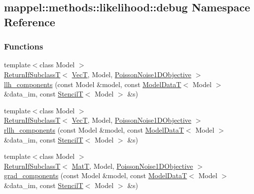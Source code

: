 \hypertarget{namespacemappel_1_1methods_1_1likelihood_1_1debug}{}\subsection{mappel\+:\+:methods\+:\+:likelihood\+:\+:debug Namespace Reference}
\label{namespacemappel_1_1methods_1_1likelihood_1_1debug}
\subsubsection*{Functions}
\begin{DoxyCompactItemize}
\item 
{\footnotesize template$<$class Model $>$ }\\\hyperlink{namespacemappel_a3b77d227658ba3ba9e16fea6fa6e626d}{Return\+If\+SubclassT}$<$ \hyperlink{namespacemappel_a2225ad69f358daa3f4f99282a35b9a3a}{VecT}, Model, \hyperlink{classmappel_1_1PoissonNoise1DObjective}{Poisson\+Noise1\+D\+Objective} $>$ \hyperlink{namespacemappel_1_1methods_1_1likelihood_1_1debug_a3ebb5c59ce538767de0717dbb543547a}{llh\+\_\+components} (const Model \&model, const \hyperlink{namespacemappel_a97f050df953605381ae9c901c3b125f1}{Model\+DataT}$<$ Model $>$ \&data\+\_\+im, const \hyperlink{namespacemappel_a3a06598240007876f8c4bf834ad86197}{StencilT}$<$ Model $>$ \&s)
\item 
{\footnotesize template$<$class Model $>$ }\\\hyperlink{namespacemappel_a3b77d227658ba3ba9e16fea6fa6e626d}{Return\+If\+SubclassT}$<$ \hyperlink{namespacemappel_a2225ad69f358daa3f4f99282a35b9a3a}{VecT}, Model, \hyperlink{classmappel_1_1PoissonNoise1DObjective}{Poisson\+Noise1\+D\+Objective} $>$ \hyperlink{namespacemappel_1_1methods_1_1likelihood_1_1debug_abee134828904f67b599234ec96a4a907}{rllh\+\_\+components} (const Model \&model, const \hyperlink{namespacemappel_a97f050df953605381ae9c901c3b125f1}{Model\+DataT}$<$ Model $>$ \&data\+\_\+im, const \hyperlink{namespacemappel_a3a06598240007876f8c4bf834ad86197}{StencilT}$<$ Model $>$ \&s)
\item 
{\footnotesize template$<$class Model $>$ }\\\hyperlink{namespacemappel_a3b77d227658ba3ba9e16fea6fa6e626d}{Return\+If\+SubclassT}$<$ \hyperlink{namespacemappel_a7091ab87c528041f7e2027195fad8915}{MatT}, Model, \hyperlink{classmappel_1_1PoissonNoise1DObjective}{Poisson\+Noise1\+D\+Objective} $>$ \hyperlink{namespacemappel_1_1methods_1_1likelihood_1_1debug_a5e367e627cf90895292099ed9d86c2db}{grad\+\_\+components} (const Model \&model, const \hyperlink{namespacemappel_a97f050df953605381ae9c901c3b125f1}{Model\+DataT}$<$ Model $>$ \&data\+\_\+im, const \hyperlink{namespacemappel_a3a06598240007876f8c4bf834ad86197}{StencilT}$<$ Model $>$ \&s)

\end{DoxyCompactItemize}
